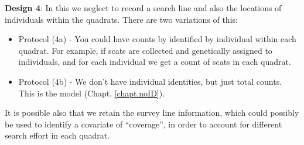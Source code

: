 {\bf Design 4}: In this we neglect to record a search line and also the locations of individuals
within the quadrats.  There are two variations of this:
\begin{itemize}
\item[] Protocol (4a) - You could have
counts by identified by individual within each quadrat. 
For example, if scats are collected and genetically assigned to individuals, and for each individual we get a count of scats in each quadrat.
\item[] Protocol (4b) - We don't have 
individual identities, but just total counts. This is the
\citet{chandler_royle:2013} model (Chapt. \ref{chapt.noID}).
\end{itemize}
It is possible also that we retain the survey line information, which
could possibly be used to identify a covariate of ``coverage'', in
order to account for different search effort in each quadrat.

